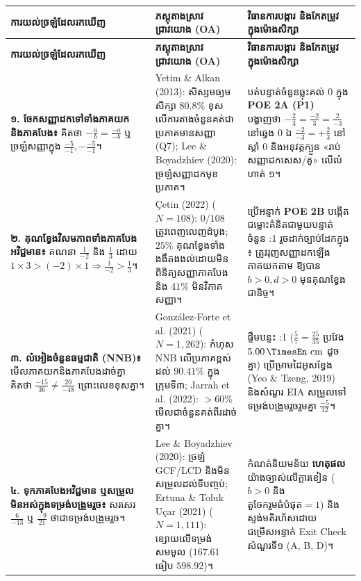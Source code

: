 \documentclass[a4paper,10pt]{article}
\newcommand{\en}[1]{{\TimesEn #1}}
\newcommand{\enbf}[1]{{\TimesEn\textbf{#1}}}
\newcommand{\unit}[1]{\,\text{\en{#1}}}
\newcommand{\cnum}[1]{{\TimesEn\fontsize{10pt}{11.5pt}\selectfont\ding{\numexpr181+#1\relax}}\hspace{0.15em}}
\begin{document}
\begin{longtable}{|L{4.85cm}|L{5.55cm}|L{7.20cm}|}
\hline
{}
\textbf{ការយល់ច្រឡំដែលរកឃើញ} & \textbf{ភស្តុតាងស្រាវជ្រាវយោង (\enbf{OA})} & \textbf{វិធានការបង្ការ និងកែតម្រូវក្នុងម៉ោងសិក្សា} \\
\hline
\endfirsthead
\hline
{}
\textbf{ការយល់ច្រឡំដែលរកឃើញ} & \textbf{ភស្តុតាងស្រាវជ្រាវយោង (\enbf{OA})} & \textbf{វិធានការបង្ការ និងកែតម្រូវក្នុងម៉ោងសិក្សា} \\
\hline
\endhead
\hline
\endfoot
\hline
\endlastfoot

\textbf{១. ចែកសញ្ញាដកទៅទាំងភាគយកនិងភាគបែង៖} គិតថា $-\frac{a}{b}=\frac{-a}{-b}$ ឬច្រឡំសញ្ញាក្នុង $\frac{-5}{-1}, -\frac{-5}{-1}$។ &
\en{Yetim \& Alkan (2013)}: សិស្សមធ្យមសិក្សា $80.8\%$ ខុសលើការតាងចំនួនគត់ជាប្រភាគមានសញ្ញា (\en{Q7}); \en{Lee \& Boyadzhiev (2020)}: ច្រឡំសញ្ញាដកមុខប្រភាគ។ &
បត់បន្ទាត់ចំនួនឆ្លុះគល់ $0$ ក្នុង \textbf{\en{POE 2A (P1)}} បង្ហាញថា $-\frac{2}{3}=\frac{-2}{3}=\frac{2}{-3}$ នៅឆ្វេង $0$ ឯ $\frac{-2}{-3}=+\frac{2}{3}$ នៅស្ដាំ $0$ និងអនុវត្តក្បួន «រាប់សញ្ញាដកសេស/គូ» លើលំហាត់ ១។ \\[3pt]

\textbf{២. គុណខ្វែងវិសមភាពទាំងភាគបែងអវិជ្ជមាន៖} គណនា $\frac{1}{-2}$ និង $\frac{1}{3}$ ដោយ $1\times 3 > (-2)\times 1 \Rightarrow \frac{1}{-2}>\frac{1}{3}$។ &
\en{Çetin (2022)} ($N=108$): $0/108$ ត្រូវពេញលេញដំបូង; $25\%$ គុណខ្វែងទាំងងងឹតងងល់ដោយមិនពិនិត្យសញ្ញាភាគបែង និង $41\%$ មិនវិភាគសញ្ញា។ &
ប្រើអន្ទាក់ \textbf{\en{POE 2B}} បង្កើតជម្លោះគំនិតជាមួយបន្ទាត់ចំនួន \en{1:1} រួចដាក់ច្បាប់ដែកក្នុង \cnum{4}៖ ត្រូវរុញសញ្ញាដកឡើងភាគយកតាម \cnum{3} ឱ្យបាន $b>0, d>0$ មុនគុណខ្វែងជានិច្ច។ \\[3pt]

\textbf{៣. លំអៀងចំនួនធម្មជាតិ (\en{NNB})៖} មើលភាគយកនិងភាគបែងដាច់គ្នា គិតថា $\frac{-15}{36}\neq\frac{20}{-48}$ ព្រោះលេខខុសគ្នា។ &
\en{González-Forte et al. (2021)} ($N=1,262$): កំហុស \en{NNB} លើប្រភាគខ្ពស់ដល់ $90.41\%$ ក្នុងក្រុមទី៣; \en{Jarrah et al. (2022)}: $>60\%$ មើលជាចំនួនគត់ពីរដាច់គ្នា។ &
ផ្ទឹមបន្ទះ \en{1:1} ($\frac{5}{7}=\frac{25}{35}$ ប្រវែង $5.00\unit{cm}$ ដូចគ្នា) ប្រើម្រាមដៃអូសខ្វែង \en{[tracing]} (\en{Yeo \& Tzeng, 2019}) និងសំណួរ \en{EIA} សម្រួលទៅទម្រង់បង្រួមរួចរួមគ្នា $\frac{-5}{12}$។ \\[3pt]

\textbf{៤. ទុកភាគបែងអវិជ្ជមាន ឬសម្រួលមិនអស់ក្នុងទម្រង់បង្រួមរួច៖} សរសេរ $\frac{6}{-13}$ ឬ $\frac{-9}{21}$ ថាជាទម្រង់បង្រួមរួច។ &
\en{Lee \& Boyadzhiev (2020)}: ច្រឡំ \en{GCF/LCD} និងមិនសម្រួលដល់ទីបញ្ចប់; \en{Ertuna \& Toluk Uçar (2021)} ($N=1,111$): ខ្សោយលើទម្រង់សមមូល ($167.61$ ធៀប $598.92$)។ &
កំណត់និយមន័យ \textbf{ហេតុផល \cnum{5}} យ៉ាងច្បាស់លើក្ដារខៀន ($b>0$ និង $\text{តួចែករួមធំបំផុត}=1$) និងស្ទង់មតិរហ័សដោយជម្រើសអន្ទាក់ \en{Exit Check} សំណួរទី១ (\en{A, B, D})។ \\[3pt]
\end{longtable}
\end{document}
